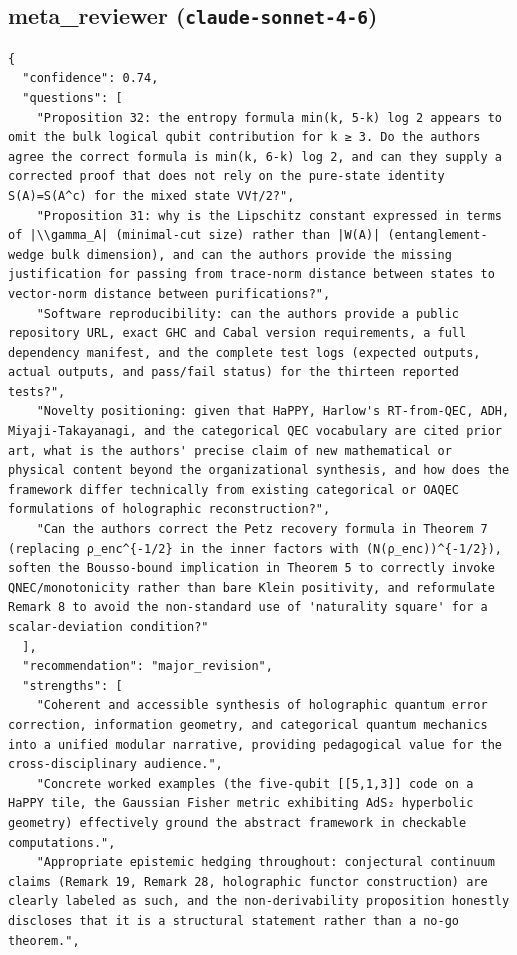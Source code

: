 \documentclass[11pt]{article}
\begin{document}
\subsection*{meta_reviewer (\texttt{claude-sonnet-4-6})}
\begin{verbatim}
{
  "confidence": 0.74,
  "questions": [
    "Proposition 32: the entropy formula min(k, 5-k) log 2 appears to omit the bulk logical qubit contribution for k ≥ 3. Do the authors agree the correct formula is min(k, 6-k) log 2, and can they supply a corrected proof that does not rely on the pure-state identity S(A)=S(A^c) for the mixed state VV†/2?",
    "Proposition 31: why is the Lipschitz constant expressed in terms of |\\gamma_A| (minimal-cut size) rather than |W(A)| (entanglement-wedge bulk dimension), and can the authors provide the missing justification for passing from trace-norm distance between states to vector-norm distance between purifications?",
    "Software reproducibility: can the authors provide a public repository URL, exact GHC and Cabal version requirements, a full dependency manifest, and the complete test logs (expected outputs, actual outputs, and pass/fail status) for the thirteen reported tests?",
    "Novelty positioning: given that HaPPY, Harlow's RT-from-QEC, ADH, Miyaji-Takayanagi, and the categorical QEC vocabulary are cited prior art, what is the authors' precise claim of new mathematical or physical content beyond the organizational synthesis, and how does the framework differ technically from existing categorical or OAQEC formulations of holographic reconstruction?",
    "Can the authors correct the Petz recovery formula in Theorem 7 (replacing ρ_enc^{-1/2} in the inner factors with (N(ρ_enc))^{-1/2}), soften the Bousso-bound implication in Theorem 5 to correctly invoke QNEC/monotonicity rather than bare Klein positivity, and reformulate Remark 8 to avoid the non-standard use of 'naturality square' for a scalar-deviation condition?"
  ],
  "recommendation": "major_revision",
  "strengths": [
    "Coherent and accessible synthesis of holographic quantum error correction, information geometry, and categorical quantum mechanics into a unified modular narrative, providing pedagogical value for the cross-disciplinary audience.",
    "Concrete worked examples (the five-qubit [[5,1,3]] code on a HaPPY tile, the Gaussian Fisher metric exhibiting AdS₂ hyperbolic geometry) effectively ground the abstract framework in checkable computations.",
    "Appropriate epistemic hedging throughout: conjectural continuum claims (Remark 19, Remark 28, holographic functor construction) are clearly labeled as such, and the non-derivability proposition honestly discloses that it is a structural statement rather than a no-go theorem.",

\end{verbatim}
\end{document}
